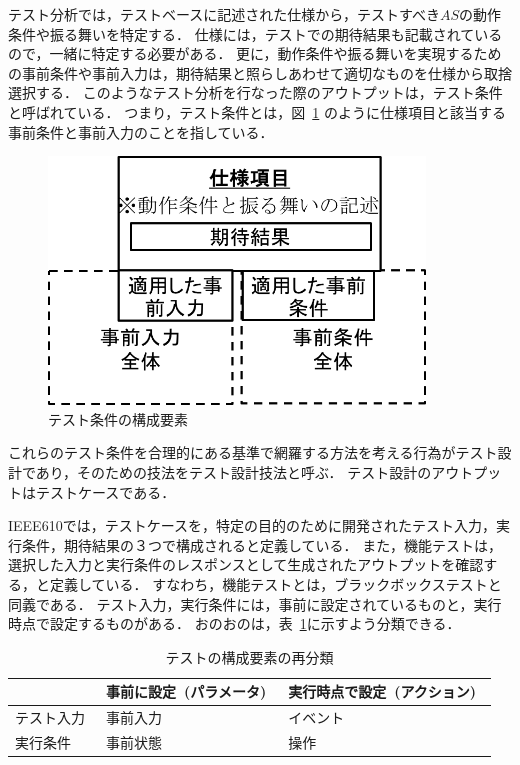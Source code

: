 テスト分析では，テストベースに記述された仕様から，テストすべき$AS$の動作条件や振る舞いを特定する．
仕様には，テストでの期待結果も記載されているので，一緒に特定する必要がある．
更に，動作条件や振る舞いを実現するための事前条件や事前入力は，期待結果と照らしあわせて適切なものを仕様から取捨選択する．
このようなテスト分析を行なった際のアウトプットは，テスト条件と呼ばれている\cite{ISTQB}．
つまり，テスト条件とは，図~\ref{fig:D-4-Fig1} のように仕様項目と該当する事前条件と事前入力のことを指している．
\begin{figure}[h]
  \begin{center}
  \includegraphics[width=10cm]{./image/D-4-Fig1.png}
  \caption{テスト条件の構成要素}
  \label{fig:D-4-Fig1}
  \end{center}
   \end{figure}

これらのテスト条件を合理的にある基準で網羅する方法を考える行為がテスト設計であり，そのための技法をテスト設計技法と呼ぶ．
テスト設計のアウトプットはテストケースである．

IEEE610では，テストケースを，特定の目的のために開発されたテスト入力，実行条件，期待結果の３つで構成されると定義している．
また，機能テストは，選択した入力と実行条件のレスポンスとして生成されたアウトプットを確認する，と定義している\cite{IEEE610}．
すなわち，機能テストとは，ブラックボックステストと同義である．
テスト入力，実行条件には，事前に設定されているものと，実行時点で設定するものがある．
おのおのは，表~\ref{tab:D-4-FigTPS}に示すよう分類できる．
\begin{table}[htbp]
  \centering
  \caption{テストの構成要素の再分類}
    \begin{tabular}{|l|l|l|}
    \hline
          & 事前に設定 (パラメータ)  & 実行時点で設定 (アクション)  \bigstrut\\
    \hline
    \hline
    テスト入力  & 事前入力  & イベント  \bigstrut\\
    \hline
    実行条件  & 事前状態  & 操作  \bigstrut\\
    \hline
    \end{tabular}%
  \label{tab:D-4-FigTPS}%
\end{table}%

